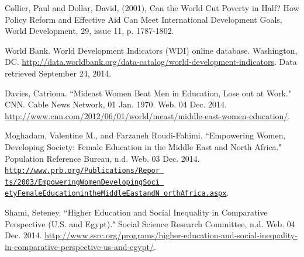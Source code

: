 \documentclass[11pt, twocolumn]{article}
\begin{document}
\begin{thebibliography}{9}

Collier, Paul and Dollar, David, (2001), Can the World Cut Poverty in Half? How Policy Reform and Effective Aid Can Meet International Development Goals, World Development, 29, issue 11, p. 1787-1802.

World Bank. World Development Indicators (WDI) online database. Washington, DC. \url{http://data.worldbank.org/data-catalog/world-development-indicators}. Data retrieved September 24, 2014.

Davies, Catriona. ``Mideast Women Beat Men in Education, Lose out at Work." CNN. Cable News Network, 01 Jan. 1970. Web. 04 Dec. 2014. \url{http://www.cnn.com/2012/06/01/world/meast/middle-east-women-education/}.

Moghadam, Valentine M., and Farzaneh Roudi-Fahimi. ``Empowering Women, Developing Society: Female Education in the Middle East and North Africa." Population Reference Bureau, n.d. Web. 03 Dec. 2014. \href{http://www.prb.org/Publications/Reports/2003/EmpoweringWomenDevelopingSocietyFemaleEducationintheMiddleEastandNorthAfrica.aspx}{\tt{http://www.prb.org/Publications/Repor ts/2003/EmpoweringWomenDevelopingSoci etyFemaleEducationintheMiddleEastandN orthAfrica.aspx}}.

Shami, Seteney. ``Higher Education and Social Inequality in Comparative Perspective (U.S. and Egypt)." Social Science Research Committee, n.d. Web. 04 Dec. 2014. \url{http://www.ssrc.org/programs/higher-education-and-social-inequality-in-comparative-perspective-us-and-egypt/}.

\end{thebibliography}

\end{document}
